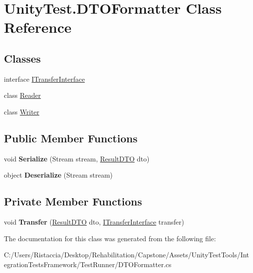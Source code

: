 \hypertarget{class_unity_test_1_1_d_t_o_formatter}{}\section{Unity\+Test.\+D\+T\+O\+Formatter Class Reference}
\label{class_unity_test_1_1_d_t_o_formatter}
\subsection*{Classes}
\begin{DoxyCompactItemize}
\item 
interface \hyperlink{interface_unity_test_1_1_d_t_o_formatter_1_1_i_transfer_interface}{I\+Transfer\+Interface}
\item 
class \hyperlink{class_unity_test_1_1_d_t_o_formatter_1_1_reader}{Reader}
\item 
class \hyperlink{class_unity_test_1_1_d_t_o_formatter_1_1_writer}{Writer}
\end{DoxyCompactItemize}
\subsection*{Public Member Functions}
\begin{DoxyCompactItemize}
\item 
\mbox{\label{class_unity_test_1_1_d_t_o_formatter_a338400a4e05f5fb97337d2d47c490b7c}} 
void {\bfseries Serialize} (Stream stream, \hyperlink{class_unity_test_1_1_result_d_t_o}{Result\+D\+TO} dto)
\item 
\mbox{\label{class_unity_test_1_1_d_t_o_formatter_a1d8dc23bd63d5cd666d11c53b18b4822}} 
object {\bfseries Deserialize} (Stream stream)
\end{DoxyCompactItemize}
\subsection*{Private Member Functions}
\begin{DoxyCompactItemize}
\item 
\mbox{\label{class_unity_test_1_1_d_t_o_formatter_a1071e4058af062862426377c254091f5}} 
void {\bfseries Transfer} (\hyperlink{class_unity_test_1_1_result_d_t_o}{Result\+D\+TO} dto, \hyperlink{interface_unity_test_1_1_d_t_o_formatter_1_1_i_transfer_interface}{I\+Transfer\+Interface} transfer)
\end{DoxyCompactItemize}


The documentation for this class was generated from the following file\+:\begin{DoxyCompactItemize}
\item 
C\+:/\+Users/\+Ristaccia/\+Desktop/\+Rehabilitation/\+Capstone/\+Assets/\+Unity\+Test\+Tools/\+Integration\+Tests\+Framework/\+Test\+Runner/D\+T\+O\+Formatter.\+cs\end{DoxyCompactItemize}
